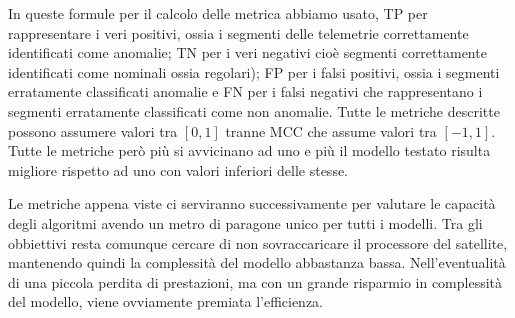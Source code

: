 In queste formule per il calcolo delle metrica abbiamo usato, TP per rappresentare i veri positivi, ossia i segmenti delle telemetrie correttamente identificati come anomalie; TN per i veri negativi cioè segmenti correttamente identificati come nominali ossia regolari); FP per i falsi positivi, ossia i segmenti erratamente classificati anomalie e FN per i falsi negativi che rappresentano i segmenti erratamente classificati come non anomalie.
Tutte le metriche descritte possono assumere valori tra $[0,1]$ tranne MCC che assume valori tra $[-1,1]$.
Tutte le metriche però più si avvicinano ad uno e più il modello testato risulta migliore rispetto ad uno con valori inferiori delle stesse.

Le metriche appena viste ci serviranno successivamente per valutare le capacità degli algoritmi avendo un metro di paragone unico per tutti i modelli.
Tra gli obbiettivi resta comunque cercare di non sovraccaricare il processore del satellite, mantenendo quindi la complessità del modello abbastanza bassa.
Nell'eventualità di una piccola perdita di prestazioni, ma con un grande risparmio in complessità del modello, viene ovviamente premiata l'efficienza.
